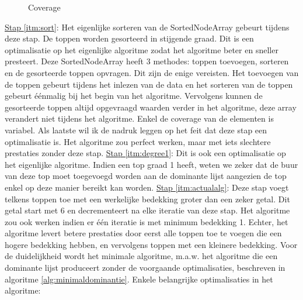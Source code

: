 \documentclass[11pt, a4paper, table]{article}
\theoremstyle{definition}
\theoremstyle{definition}
\theoremstyle{definition}
\begin{document}
\begin{figure}
	\centering
	\label{fig:example_coverage}
	\caption{Coverage}
\end{figure}
\newline\underline{Stap \ref{itm:sort}}: Het eigenlijke sorteren van de SortedNodeArray gebeurt tijdens deze stap. De toppen worden gesorteerd in stijgende graad. Dit is een optimalisatie op het eigenlijke algoritme zodat het algoritme beter en sneller presteert. Deze SortedNodeArray heeft 3 methodes: toppen toevoegen, sorteren en de gesorteerde toppen opvragen. Dit zijn de enige vereisten. Het toevoegen van de toppen gebeurt tijdens het inlezen van de data en het sorteren van de toppen gebeurt \'{e}\'{e}nmalig bij het begin van het algoritme. Vervolgens kunnen de gesorteerde toppen altijd opgevraagd waarden verder in het algoritme, deze array verandert niet tijdens het algoritme. Enkel de coverage van de elementen is variabel. Als laatste wil ik de nadruk leggen op het feit dat deze stap een optimalisatie is. Het algoritme zou perfect werken, maar met iets slechtere prestaties zonder deze stap.
\newline\underline{Stap \ref{itm:degree1}}: Dit is ook een optimalisatie op het eigenlijke algoritme. Indien een top graad 1 heeft, weten we zeker dat de buur van deze top moet toegevoegd worden aan de dominante lijst aangezien de top enkel op deze manier bereikt kan worden. 
\newline\underline{Stap \ref{itm:actualalg}}: Deze stap voegt telkens toppen toe met een werkelijke bedekking groter dan een zeker getal. Dit getal start met 6 en decrementeert na elke iteratie van deze stap. Het algoritme zou ook werken indien er \'{e}\'{e}n iteratie is met minimum bedekking 1. Echter, het algoritme levert betere prestaties door eerst alle toppen toe te voegen die een hogere bedekking hebben, en vervolgens toppen met een kleinere bedekking.  Voor de duidelijkheid wordt het minimale algoritme, m.a.w. het algoritme die een dominante lijst produceert zonder de voorgaande optimalisaties, beschreven in algoritme \ref{alg:minimaldominantie}. Enkele belangrijke optimalisaties in het algoritme: 
\end{document}
